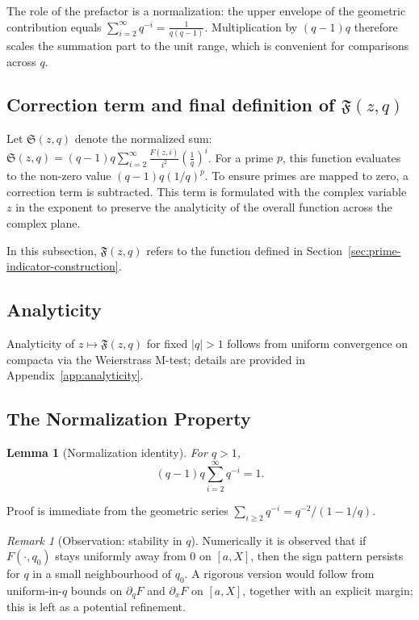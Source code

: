 \documentclass[11pt,a4paper]{amsart}
\newcommand{\F}{F}
\theoremstyle{plain}
\newtheorem{lemma}[theorem]{Lemma}
\theoremstyle{definition}
\theoremstyle{remark}
\newtheorem{remark}[theorem]{Remark}
\begin{document}
The role of the prefactor is a normalization: the upper envelope of the geometric contribution equals $\sum_{i=2}^{\infty} q^{-i}=\frac{1}{q(q-1)}$. Multiplication by $(q-1)q$ therefore scales the summation part to the unit range, which is convenient for comparisons across $q$.

\subsection{Correction term and final definition of $\mathfrak{F}(z,q)$}
\label{app:correction-term}
Let $\mathfrak{S}(z,q)$ denote the normalized sum: $\mathfrak{S}(z,q) = (q-1)q \sum_{i=2}^{\infty} \frac{F(z,i)}{i^2} (\frac{1}{q})^i$. For a prime $p$, this function evaluates to the non-zero value $(q-1)q(1/q)^p$. To ensure primes are mapped to zero, a correction term is subtracted. This term is formulated with the complex variable $z$ in the exponent to preserve the analyticity of the overall function across the complex plane.

In this subsection, $\mathfrak{F}(z,q)$ refers to the function defined in Section~\ref{sec:prime-indicator-construction}.

\subsection{Analyticity}
\label{app:analyticity-brief}
Analyticity of $z\mapsto \mathfrak{F}(z,q)$ for fixed $|q|>1$ follows from uniform convergence on compacta via the Weierstrass M-test; details are provided in Appendix~\ref{app:analyticity}.


\subsection{The Normalization Property}
\begin{lemma}[Normalization identity]\label{lem:normalization}
For $q>1$,
\[
(q-1)q\sum_{i=2}^{\infty} q^{-i} = 1.
\]
\end{lemma}
\noindent Proof is immediate from the geometric series $\sum_{i\ge2}q^{-i}=q^{-2}/(1-1/q)$.

\begin{remark}[Observation: stability in $q$]\label{lem:q-bridge}
Numerically it is observed that if $\F(\cdot,q_0)$ stays uniformly away from $0$ on $[a,X]$, then the sign pattern persists for $q$ in a small neighbourhood of $q_0$. A rigorous version would follow from uniform-in-$q$ bounds on $\partial_q\F$ and $\partial_x\F$ on $[a,X]$, together with an explicit margin; this is left as a potential refinement.
\end{remark}
\end{document}
